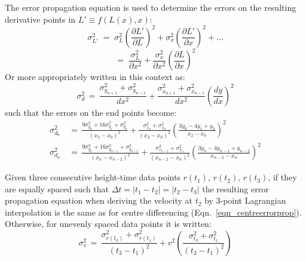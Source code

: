 \documentclass[namedreferences]{SolarPhysics}
\begin{document}
\begin{article}
The error propagation equation is used to determine the errors on the resulting derivative points in $L' \equiv f(L(x),x)$:
\begin{equation}
\sigma_{L'}^2 \; = \; \sigma_L^2 \left(\frac{\partial L'}{\partial L}\right)^2 + \sigma_x^2\left(\frac{\partial L'}{\partial x}\right)^2+...
\end{equation}
\begin{equation}
=\; \frac{\sigma_L^2}{\partial x^2}+\frac{\sigma_x^2}{\partial x^2}\left(\frac{\partial L}{\partial x}\right)^2
\end{equation}
Or more appropriately written in this context as:
\begin{equation}
\sigma_d^2 \,=\, \frac{\sigma_{y_{n+1}}^2+\sigma_{y_{n-1}}^2}{dx^2} + \frac{\sigma_{x_{n+1}}^2+\sigma_{x_{n-1}}^2}{dx^2}\left(\frac{dy}{dx}\right)^2
\end{equation}
such that the errors on the end points become:
\begin{eqnarray}
\sigma_{d_0}^2 \,&=\, \frac{9\sigma_{y_0}^2+16\sigma_{y_1}^2+\sigma_{y_2}^2}{\left(x_2-x_0\right)^2} + \frac{\sigma_{x_2}^2+\sigma_{x_0}^2}{\left(x_2-x_0\right)^2} \left( \frac{3y_0-4y_1+y_2}{x_2-x_0}\right)^2 \\
\sigma_{d_n}^2 \,&=\, \frac{9\sigma_{y_n}^2+16\sigma_{y_{n-1}}^2+\sigma_{y_{n-2}}^2}{\left(x_n-x_{n-2}\right)^2} + \frac{\sigma_{x_{n-2}}^2+\sigma_{x_n}^2}{\left(x_{n-2}-x_n\right)^2} \left( \frac{3y_n-4y_{n-1}+y_{n-2}}{x_{n-2}-x_n}\right)^2
\end{eqnarray}

Given three consecutive height-time data points $r(t_1)$, $r(t_2)$, $r(t_3)$, if they are equally spaced such that $\Delta t=|t_1-t_2|=|t_2-t_3|$ the resulting error propagation equation when deriving the velocity at $t_2$ by 3-point Lagrangian interpolation is the same as for centre differencing (Eqn.~\ref{eqn_centreerrorprop}). Otherwise, for unevenly spaced data points it is written:
\begin{equation}
\sigma_v^2 \,=\, \frac{\sigma_{r(t_3)}^2+\sigma_{r(t_1)}^2}{(t_3-t_1)^2} + v^2 \left( \frac{\sigma_{t_3}^2+\sigma_{t_1}^2}{(t_3-t_1)^2} \right)
\end{equation}



\end{article}
\end{document}
